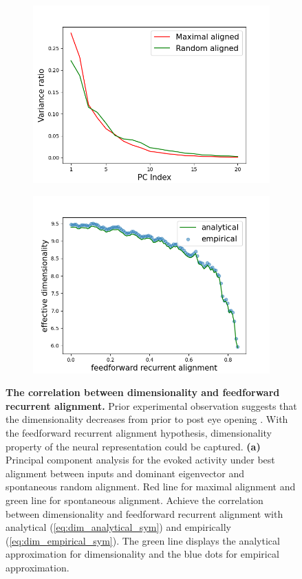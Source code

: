 \documentclass[11pt]{article}
\begin{document}
		\begin{figure}[H] 
			\centering
			\begin{subfigure}[b]{0.45\textwidth} 
				\includegraphics[width=\textwidth]{../figures/dim_align_rand_sym.png}
				\caption{}
			\end{subfigure}
			\begin{subfigure}[b]{0.45\textwidth}
				\includegraphics[width=\textwidth]{../figures/dim_sym.png}
				\caption{}
				\label{fig:dim_sym}
			\end{subfigure}
			\vspace{-0.2cm}
			\caption{\textbf{The correlation between dimensionality and feedforward recurrent alignment.} Prior experimental observation suggests that the dimensionality decreases from prior to post eye opening \cite{tragenap2023nature}. With the feedforward recurrent alignment hypothesis, dimensionality property of the neural representation could be captured. \textbf{(a)} Principal component analysis for the evoked activity under best alignment between inputs and dominant eigenvector and spontaneous random alignment. Red line for maximal alignment and green line for spontaneous alignment.  Achieve the correlation between dimensionality and feedforward recurrent alignment with analytical (\ref{eq:dim_analytical_sym}) and empirically (\ref{eq:dim_empirical_sym}). The green line displays the analytical approximation for dimensionality and the blue dots for empirical approximation.} 

\end{figure}
\end{document}
